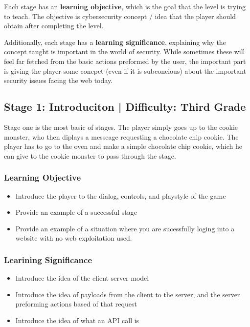 \documentclass{article}
\begin{document}
Each stage has an \textbf{learning objective}, which is the goal that
the level is trying to teach. The objective is cybersecurity concept /
idea that the player should obtain after completing the level.

Additionally, each stage has a \textbf{learning significance},
explaining why the concept taught is important in the world of
security. While sometimes these will feel far fetched from the basic
actions preformed by the user, the important part is giving the player
some concpet (even if it is subconcious) about the important security
issues facing the web today.

\subsection{Stage 1: Introduciton | Difficulty: Third Grade}

Stage one is the most basic of stages. The player simply goes up to
the cookie monster, who then diplays a messeage requesting a chocolate
chip cookie. The player has to go to the oven and make a simple
chocolate chip cookie, which he can give to the cookie monster to pass
through the stage.

\subsubsection{Learning Objective}

\begin{itemize}

  \item Introduce the player to the dialog, controls, and playstyle of
the game
  \item Provide an example of a successful stage
  \item Provide an example of a situation where you are sucessfully
loging into a website with no web exploitation used.
\end{itemize}

\subsubsection{Learining Significance}

\begin{itemize}
  \item Introduce the idea of the client server model
  \item Introduce the idea of payloads from the client to the server,
    and the server preforming actions based of that request
  \item Introduce the idea of what an API call is
\end{itemize}
\end{document}
